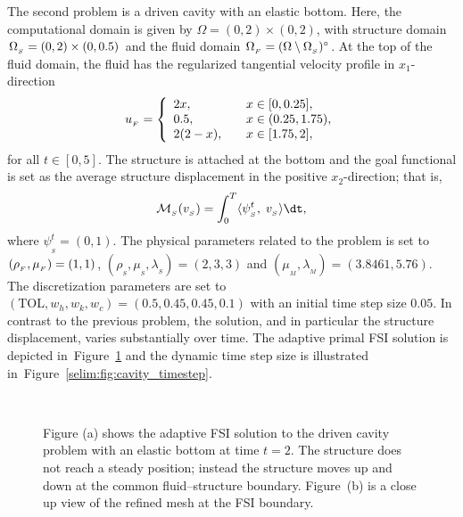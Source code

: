 The second problem is a driven cavity with an elastic bottom. Here,
the computational domain is given by $\Omega = (0,2)\times (0,2)$,
with structure domain $\Omega_{_{S}} = (0, 2)\times (0, 0.5)$ and the fluid
domain $\Omega_{_{F}} = (\Omega\setminus \Omega_{_{S}})^{\circ}$. At the top of the fluid
domain, the fluid has the regularized tangential velocity profile in
$x_1$-direction
\begin{equation}
u_{_{F}} =
\left\{
\begin{array}{lcl}
2x,& &x\in[0, 0.25],\\
0.5,& &x\in(0.25 ,1.75),\\
2(2-x),&  &x\in[1.75, 2],
\end{array}
\right.
\end{equation}
for all $t \in [0,5]$. The structure is attached at the bottom and the
goal functional is set as the average structure displacement in the positive
$x_2$-direction; that is,
\begin{equation}
\label{selim:eq:goalfunctional_cavity}
\M_{_{S}}(v_{_{S}}) = \int_0^T \langle \psi^t_{_{S}},\; v_{_{S}}\rangle \dt,
\end{equation}
where $\psi^t_{_{S}}=(0,1)$.  The physical parameters related to the
problem is set to $(\rho_{_{F}},\mu_{_{F}}) = (1, 1)$,
$(\rho_{_{S}},\mu_{_{S}}, \lambda_{_{S}}) = (2, 3, 3)$ and
$(\mu_{_{M}}, \lambda_{_{M}}) = (3.8461, 5.76)$. The discretization
parameters are set to $(\mathrm{TOL}, w_h, w_k,w_c) = (0.5, 0.45,
0.45, 0.1)$ with an initial time step size $0.05$.  In contrast to the
previous problem, the solution, and in particular the structure
displacement, varies substantially over time. The adaptive primal FSI
solution is depicted in~Figure~\ref{selim:fig:primal_cavity} and the
dynamic time step size is illustrated
in~Figure~\ref{selim:fig:cavity_timestep}.

\begin{figure}
  \centering
   \\
  \caption{Figure (a) shows the adaptive FSI solution to the driven
    cavity problem with an elastic bottom at time $t=2$. The structure
    does not reach a steady position; instead the structure moves up and
    down at the common fluid--structure boundary. Figure~(b) is a close
    up view of the refined mesh at the FSI boundary.}
  \label{selim:fig:primal_cavity}
\end{figure}

